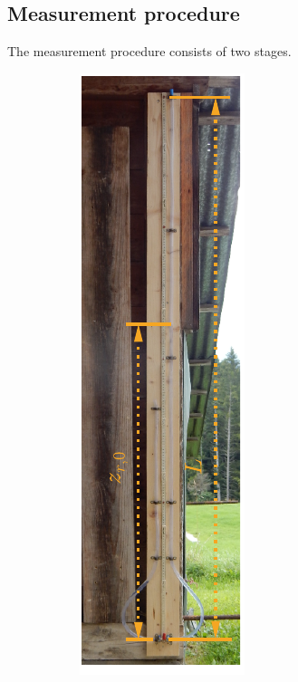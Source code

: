 \documentclass[a4paper,10pt, twocolumn]{article}
\begin{document}
\subsection{Measurement procedure}
The measurement procedure consists of two stages. 
\begin{figure}[h!]
	\centering
	\begin{subfigure}{0.22\textwidth}
		\centering
		\includegraphics[width=\textwidth]{figures/initial.pdf}

\end{subfigure}
\end{figure}
\end{document}
